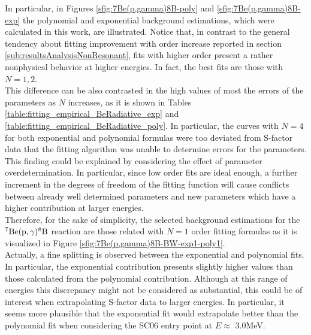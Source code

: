 \documentclass[openany]{book}
\begin{document}
In particular, in Figures \ref{sfig:7Be(p,gamma)8B-poly} and \ref{sfig:7Be(p,gamma)8B-exp} the polynomial and exponential background estimations, which were calculated in this work, are illustrated. Notice that, in contrast to the general tendency about fitting improvement with order increase reported in section \ref{sub:resultsAnalysisNonResonant}, fits with higher order present a rather nonphysical behavior at higher energies. In fact, the best fits are those with $N = 1, 2$.  \\

This difference can be also contrasted in the high values of most the errors of the parameters as $N$ increases, as it is shown in Tables \ref{table:fitting_empirical_BeRadiative_exp} and \ref{table:fitting_empirical_BeRadiative_poly}. In particular, the curves with $N = 4$ for both exponential and polynomial formulas were too deviated from S-factor data that the fitting algorithm was unable to determine errors for the parameters.   \\

This finding could be explained by considering the effect of parameter overdetermination. In particular, since low order fits are ideal enough, a further increment in the degrees of freedom of the fitting function will cause conflicts between already well determined parameters and new parameters which have a higher contribution at larger energies.  \\

Therefore, for the sake of simplicity, the selected background estimations for the $\mathrm{{}^{7}Be(p, \gamma){}^{8}B}$ reaction are those related with $N = 1$ order fitting formulas as it is visualized in Figure \ref{sfig:7Be(p,gamma)8B-BW-exp1-poly1}. \\

Actually, a fine splitting is observed between the exponential and polynomial fits. In particular, the exponential contribution presents slightly higher values than those calculated from the polynomial contribution. Although at this range of energies this discrepancy might not be considered as substantial, this could be of interest when extrapolating S-factor data to larger energies. In particular, it seems more plausible that the exponential fit would extrapolate better than the polynomial fit when considering the SC06 entry point at $E \approx$ 3.0MeV. \\
\end{document}
